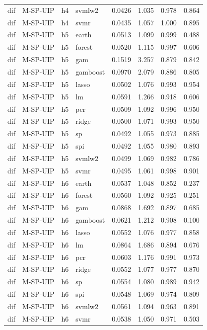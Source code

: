 \begin{ThreePartTable}
\begin{longtable}[t]{llclcccc}
dif & M-SP-UIP & h4 & svmlw2 & 0.0426 & 1.035 & 0.978 & 0.864\\
dif & M-SP-UIP & h4 & svmr & 0.0435 & 1.057 & 1.000 & 0.895\\
\addlinespace
dif & M-SP-UIP & h5 & earth & 0.0513 & 1.099 & 0.999 & 0.488\\
dif & M-SP-UIP & h5 & forest & 0.0520 & 1.115 & 0.997 & 0.606\\
dif & M-SP-UIP & h5 & gam & 0.1519 & 3.257 & 0.879 & 0.842\\
dif & M-SP-UIP & h5 & gamboost & 0.0970 & 2.079 & 0.886 & 0.805\\
dif & M-SP-UIP & h5 & lasso & 0.0502 & 1.076 & 0.993 & 0.954\\
dif & M-SP-UIP & h5 & lm & 0.0591 & 1.266 & 0.918 & 0.606\\
dif & M-SP-UIP & h5 & pcr & 0.0509 & 1.092 & 0.996 & 0.950\\
dif & M-SP-UIP & h5 & ridge & 0.0500 & 1.071 & 0.993 & 0.950\\
dif & M-SP-UIP & h5 & sp & 0.0492 & 1.055 & 0.973 & 0.885\\
dif & M-SP-UIP & h5 & spi & 0.0492 & 1.055 & 0.980 & 0.893\\
dif & M-SP-UIP & h5 & svmlw2 & 0.0499 & 1.069 & 0.982 & 0.786\\
dif & M-SP-UIP & h5 & svmr & 0.0495 & 1.061 & 0.998 & 0.901\\
\addlinespace
dif & M-SP-UIP & h6 & earth & 0.0537 & 1.048 & 0.852 & 0.237\\
dif & M-SP-UIP & h6 & forest & 0.0560 & 1.092 & 0.925 & 0.251\\
dif & M-SP-UIP & h6 & gam & 0.0868 & 1.692 & 0.897 & 0.685\\
dif & M-SP-UIP & h6 & gamboost & 0.0621 & 1.212 & 0.908 & 0.100\\
dif & M-SP-UIP & h6 & lasso & 0.0552 & 1.076 & 0.977 & 0.858\\
dif & M-SP-UIP & h6 & lm & 0.0864 & 1.686 & 0.894 & 0.676\\
dif & M-SP-UIP & h6 & pcr & 0.0603 & 1.176 & 0.991 & 0.973\\
dif & M-SP-UIP & h6 & ridge & 0.0552 & 1.077 & 0.977 & 0.870\\
dif & M-SP-UIP & h6 & sp & 0.0554 & 1.080 & 0.989 & 0.942\\
dif & M-SP-UIP & h6 & spi & 0.0548 & 1.069 & 0.974 & 0.809\\
dif & M-SP-UIP & h6 & svmlw2 & 0.0561 & 1.094 & 0.963 & 0.891\\
dif & M-SP-UIP & h6 & svmr & 0.0538 & 1.050 & 0.971 & 0.503\\

\end{longtable}
\end{ThreePartTable}
